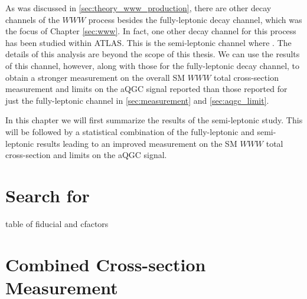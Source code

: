 
As was discussed in \sec\ref{sec:theory_www_production}, there are other decay
channels of the $WWW$ process besides the fully-leptonic decay channel,
which was the focus of Chapter \ref{sec:www}.  
In fact, one other decay channel for this process has been studied within 
ATLAS. This is the semi-leptonic channel where \wwwlljj. The details of this 
analysis are beyond the scope of this thesis. We can use the results of this channel,
however, along with those for the fully-leptonic decay channel, to obtain a stronger measurement
on the overall SM $WWW$ total cross-section measurement and limits on the aQGC signal reported than
those reported for just the fully-leptonic 
channel in \sec\ref{sec:measurement} and \sec\ref{sec:aqgc_limit}. 


In this chapter we will first summarize the results of the semi-leptonic study. 
This will be followed by a statistical combination of the fully-leptonic and semi-leptonic
results leading to an improved  
measurement on the SM $WWW$ total cross-section and limits on the 
aQGC signal.




\section{Search for \wwwlljj}
\label{sec:semilep}







table of fiducial and cfactors

\section{Combined Cross-section Measurement}
\label{sec:combined_measurement}

